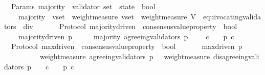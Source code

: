\begin{isabellebody}
%
\isadelimproof
\isanewline
%
\endisadelimproof
\isanewline
\isanewline
{}\isamarkupfalse%
\ {\isacharparenleft}\ Params{\isacharparenright}\ majority\ {\isacharcolon}{\isacharcolon}\ {\isachardoublequoteopen}{\isacharparenleft}validator\ set\ {\isacharasterisk}\ state{\isacharparenright}\ {\isasymRightarrow}\ bool{\isachardoublequoteclose}\isanewline
\ \ \isanewline
\ \ \ \ {\isachardoublequoteopen}majority\ {\isacharequal}\ {\isacharparenleft}{\isasymlambda}{\isacharparenleft}v{\isacharunderscore}set{\isacharcomma}\ {\isasymsigma}{\isacharparenright}{\isachardot}\ {\isacharparenleft}weight{\isacharunderscore}measure\ v{\isacharunderscore}set\ {\isachargreater}\ {\isacharparenleft}weight{\isacharunderscore}measure\ {\isacharparenleft}V\ {\isacharminus}\ equivocating{\isacharunderscore}validators\ {\isasymsigma}{\isacharparenright}{\isacharparenright}\ div\ {}{\isacharparenright}{\isacharparenright}{\isachardoublequoteclose}\isanewline
\ \ \ \isanewline
\isanewline
{}\isamarkupfalse%
\ {\isacharparenleft}\ Protocol{\isacharparenright}\ majority{\isacharunderscore}driven\ {\isacharcolon}{\isacharcolon}\ {\isachardoublequoteopen}consensus{\isacharunderscore}value{\isacharunderscore}property\ {\isasymRightarrow}\ bool{\isachardoublequoteclose}\isanewline
\ \ \isanewline
\ \ \ \ {\isachardoublequoteopen}majority{\isacharunderscore}driven\ p\ {\isacharequal}\ {\isacharparenleft}{\isasymforall}\ {\isasymsigma}\ {\isasymin}\ {\isasymSigma}{\isachardot}\ majority\ {\isacharparenleft}agreeing{\isacharunderscore}validators\ {\isacharparenleft}p{\isacharcomma}\ {\isasymsigma}{\isacharparenright}{\isacharcomma}\ {\isasymsigma}{\isacharparenright}\ {\isasymlongrightarrow}\ {\isacharparenleft}{\isasymforall}\ c\ {\isasymin}\ {\isasymepsilon}\ {\isasymsigma}{\isachardot}\ p\ c{\isacharparenright}{\isacharparenright}{\isachardoublequoteclose}\isanewline
\isanewline
\isanewline
\isanewline
{}\isamarkupfalse%
\ {\isacharparenleft}\ Protocol{\isacharparenright}\ max{\isacharunderscore}driven\ {\isacharcolon}{\isacharcolon}\ {\isachardoublequoteopen}consensus{\isacharunderscore}value{\isacharunderscore}property\ {\isasymRightarrow}\ bool{\isachardoublequoteclose}\isanewline
\ \ \isanewline
\ \ \ \ {\isachardoublequoteopen}max{\isacharunderscore}driven\ p\ {\isacharequal}\isanewline
\ \ \ \ \ \ {\isacharparenleft}{\isasymforall}\ {\isasymsigma}\ {\isasymin}\ {\isasymSigma}{\isachardot}\ weight{\isacharunderscore}measure\ {\isacharparenleft}agreeing{\isacharunderscore}validators\ {\isacharparenleft}p{\isacharcomma}\ {\isasymsigma}{\isacharparenright}{\isacharparenright}\ {\isachargreater}\ weight{\isacharunderscore}measure\ {\isacharparenleft}disagreeing{\isacharunderscore}validators\ {\isacharparenleft}p{\isacharcomma}\ {\isasymsigma}{\isacharparenright}{\isacharparenright}\ {\isasymlongrightarrow}\ {\isacharparenleft}{\isasymforall}\ c\ {\isasymin}\ {\isasymepsilon}\ {\isasymsigma}{\isachardot}\ p\ c{\isacharparenright}{\isacharparenright}{\isachardoublequoteclose}\isanewline

\end{isabellebody}
